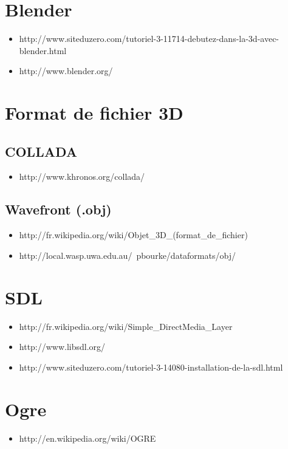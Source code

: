 \documentclass[a4paper,12pt]{report}
\begin{document}
\section*{Blender}
\begin{itemize}
 \item http://www.siteduzero.com/tutoriel-3-11714-debutez-dans-la-3d-avec-blender.html
 
 \item http://www.blender.org/
\end{itemize}
  

\section*{Format de fichier 3D}
\subsection*{COLLADA}
\begin{itemize}
 \item http://www.khronos.org/collada/
\end{itemize}

\subsection*{Wavefront (.obj)}
\begin{itemize}
 \item http://fr.wikipedia.org/wiki/Objet\_3D\_(format\_de\_fichier)
 
 \item http://local.wasp.uwa.edu.au/~pbourke/dataformats/obj/
\end{itemize}


\section*{SDL}
\begin{itemize}
 \item http://fr.wikipedia.org/wiki/Simple\_DirectMedia\_Layer

 \item http://www.libsdl.org/

 \item http://www.siteduzero.com/tutoriel-3-14080-installation-de-la-sdl.html
\end{itemize}


\section*{Ogre}
\begin{itemize}
 \item http://en.wikipedia.org/wiki/OGRE
\end{itemize}
   
\end{document}

